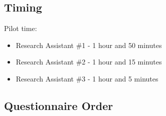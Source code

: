 \documentclass[]{book}
\providecommand{\tightlist}{%
  \setlength{\itemsep}{0pt}\setlength{\parskip}{0pt}}
\begin{document}
\hypertarget{timing-1}{%
\subsection{Timing}\label{timing-1}}

Pilot time:

\begin{itemize}
\tightlist
\item
  Research Assistant \#1 - 1 hour and 50 minutes
\item
  Research Assistant \#2 - 1 hour and 15 minutes
\item
  Research Assistant \#3 - 1 hour and 5 minutes
\end{itemize}

\hypertarget{questionnaire-order-1}{%
\subsection{Questionnaire Order}\label{questionnaire-order-1}}
\end{document}
